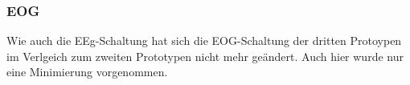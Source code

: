 \subsubsection{EOG} \label{eog-subsubsec}

Wie auch die EEg-Schaltung hat sich die EOG-Schaltung der dritten Protoypen im Verlgeich zum zweiten Prototypen nicht mehr geändert. Auch hier wurde nur eine Minimierung vorgenommen.




